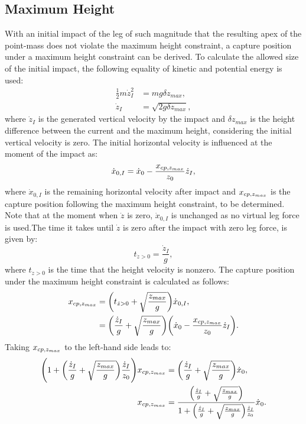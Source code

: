 \subsection{Maximum Height}
With an initial impact of the leg of such magnitude that the resulting apex of the point-mass does not violate the maximum height constraint, a capture position under a maximum height constraint can be derived. To calculate the allowed size of the initial impact, the following equality of kinetic and potential energy is used:
\begin{align}
 	\frac{1}{2}m\dot{z}_I^2 &= mg\delta z_{max},\\
 	\dot{z}_I &= \sqrt{2g\delta z_{max}},
\end{align}
where $\dot{z}_I$ is the generated vertical velocity by the impact and $\delta z_{max}$ is the height difference between the current and the maximum height, considering the initial vertical velocity is zero. The initial horizontal velocity is influenced at the moment of the impact as:
\begin{equation}\label{eq:dotximpact}
	\dot{x}_{0,I} = \dot{x}_0-\frac{x_{cp,z_{max}}}{z_0}\dot{z}_I,
\end{equation}
where $\dot{x}_{0,I}$ is the remaining horizontal velocity after impact and $x_{cp,z_{max}}$ is the capture position following the maximum height constraint, to be determined. Note that at the moment when $\dot{z}$ is zero, $\dot{x}_{0,I}$ is unchanged as no virtual leg force is used.The time it takes until $\dot{z}$ is zero after the impact with zero leg force, is given by:
\begin{equation}
	t_{\dot{z}>0} =\frac{\dot{z}_I}{g},
\end{equation}
where $t_{\dot{z}>0}$ is the time that the height velocity is nonzero. The capture position under the maximum height constraint is calculated as follows:
\begin{align}
	x_{cp,z_{max}}&=\bigg(t_{\dot{z}>0}+\sqrt{\frac{z_{max}}{g}}\bigg)\dot{x}_{0,I},\\
			&=\bigg(\frac{\dot{z}_I}{g}+\sqrt{\frac{z_{max}}{g}}\bigg)\bigg(\dot{x}_0-\frac{x_{cp,z_{max}}}{z_0}\dot{z}_I\bigg).
\end{align}
Taking $x_{cp,z_{max}}$ to the left-hand side leads to:
\begin{align}
	 \Bigg(1+\bigg(\frac{\dot{z}_I}{g}+\sqrt{\frac{z_{max}}{g}}\bigg)\frac{\dot{z}_I}{z_0}\Bigg)x_{cp,z_{max}}& =		\bigg(\frac{\dot{z}_I}{g}+\sqrt{\frac{z_{max}}{g}}\bigg)\dot{x}_0,\\
	 x_{cp,z_{max}} & = \frac{\Big(\frac{\dot{z}_I}{g}+\sqrt{\frac{z_{max}}{g}}\Big)}{ 1+\Big(\frac{\dot{z}_I}{g}+\sqrt{\frac{z_{max}}{g}}\Big)\frac{\dot{z}_I}{z_0}}\dot{x}_0.
\end{align}
